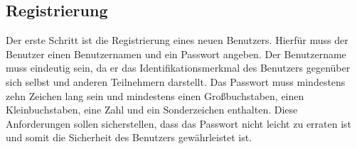 \subsection{Registrierung}
\label{subsec:registrierung}



Der erste Schritt ist die Registrierung eines neuen Benutzers. Hierfür muss der Benutzer einen Benutzernamen
und ein Passwort angeben. Der Benutzername muss eindeutig sein, da er das Identifikationsmerkmal 
des Benutzers gegenüber sich selbst und anderen Teilnehmern darstellt.
Das Passwort muss mindestens zehn Zeichen lang sein und mindestens einen Großbuchstaben, einen Kleinbuchstaben,
eine Zahl und ein Sonderzeichen enthalten. Diese Anforderungen sollen sicherstellen, dass das Passwort
nicht leicht zu erraten ist und somit die Sicherheit des Benutzers gewährleistet ist.
